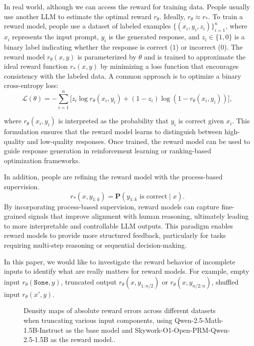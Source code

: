\documentclass{article}
\begin{document}
In real world, although we can access the reward for training data. People usually use another LLM to estimate the optimal reward $r_\theta$. Ideally, $r_\theta  \approx r_*$.
To train a reward model, people use a dataset of labeled examples \(\{(x_i, y_i, z_i)\}_{i=1}^n\), where \( x_i \) represents the input prompt, \( y_i \) is the generated response, and \( z_i \in \{1, 0\} \) is a binary label indicating whether the response is correct (\(1\)) or incorrect (\(0\)). The reward model \( r_\theta(x, y) \) is parameterized by \(\theta\) and is trained to approximate the ideal reward function \( r_*(x, y) \) by minimizing a loss function that encourages consistency with the labeled data. A common approach is to optimize a binary cross-entropy loss:
\[
\mathcal{L}(\theta) = -\sum_{i=1}^n \big[ z_i \log r_\theta(x_i, y_i) + (1 - z_i) \log (1 - r_\theta(x_i, y_i)) \big],
\]

where \( r_\theta(x_i, y_i) \) is interpreted as the probability that \( y_i \) is correct given \( x_i \). This formulation ensures that the reward model learns to distinguish between high-quality and low-quality responses. Once trained, the reward model can be used to guide response generation in reinforcement learning or ranking-based optimization frameworks.

In addition, people are refining the reward model with the process-based supervision.
$$
r_*(x,y_{1:k}) = \textbf{P}(y_{1:k}\text{ is correct} \mid x).
$$
By incorporating process-based supervision, reward models can capture fine-grained signals that improve alignment with human reasoning, ultimately leading to more interpretable and controllable LLM outputs. This paradigm enables reward models to provide more structured feedback, particularly for tasks requiring multi-step reasoning or sequential decision-making.

In this paper, we would like to investigate the reward behavior of incomplete inputs to identify what are really matters for reward models. For example, empty input 
 $r_\theta(\mathtt{None},y)$, truncated output $r_\theta(x,y_{1:n/2})$ or $r_\theta(x,y_{n/2:n})$, shuffled input $r_\theta(x',y)$.

\begin{figure}[!ht]
    \centering
    
    
    \caption{Density maps of absolute reward errors across different datasets when truncating various input components, using Qwen-2.5-Math-1.5B-Instruct as the base model and Skywork-O1-Open-PRM-Qwen-2.5-1.5B as the reward model..}
    \label{fig:truncation}
\end{figure}
\end{document}
